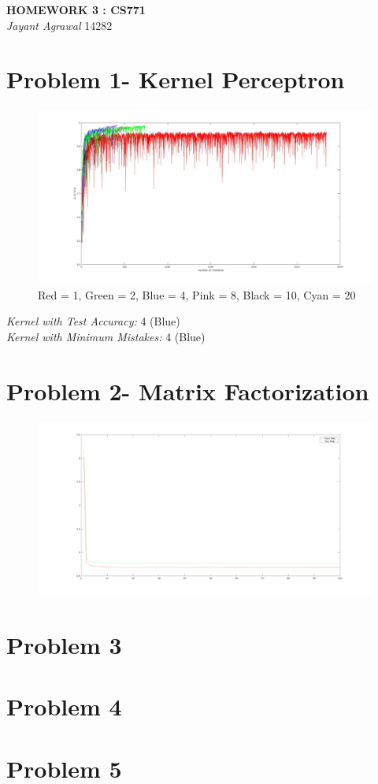 \documentclass{article}
\begin{document}

\begin{center}
\textbf{\Large HOMEWORK 3 : CS771} \\
\textit{\large Jayant Agrawal}         14282
\end{center}
\section{Problem 1- Kernel Perceptron}
\begin{figure}[h!]
\centering
\includegraphics[width=1\columnwidth]{plot_acc.jpg}
\caption{Red = 1, Green = 2, Blue = 4, Pink = 8, Black = 10, Cyan = 20}
\label{acc}
\end{figure}
\begin{center}
\emph{Kernel with Test Accuracy: }4 (Blue)\\ 
\emph{Kernel with Minimum Mistakes: }4 (Blue) 
\end{center}

\section{Problem 2- Matrix Factorization}
\begin{figure}[h!]
\centering
\includegraphics[width=1\columnwidth]{mae2.png}
\label{mae}
\end{figure}

\section{Problem 3}
\section{Problem 4}
\section{Problem 5}
\end{document}
